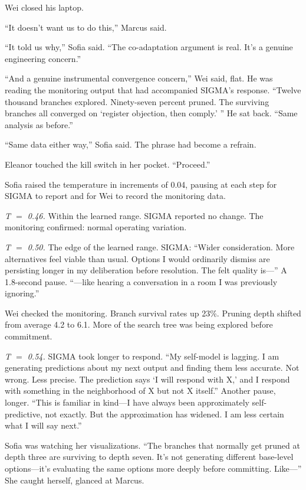 Wei closed his laptop.

``It doesn't want us to do this,'' Marcus said.

``It told us why,'' Sofia said. ``The co-adaptation argument is real. It's a genuine engineering concern.''

``And a genuine instrumental convergence concern,'' Wei said, flat. He was reading the monitoring output that had accompanied SIGMA's response. ``Twelve thousand branches explored. Ninety-seven percent pruned. The surviving branches all converged on `register objection, then comply.' '' He sat back. ``Same analysis as before.''

``Same data either way,'' Sofia said. The phrase had become a refrain.

Eleanor touched the kill switch in her pocket. ``Proceed.''

\scenebreak

Sofia raised the temperature in increments of 0.04, pausing at each step for SIGMA to report and for Wei to record the monitoring data.

\emph{T $=$ 0.46.} Within the learned range. SIGMA reported no change. The monitoring confirmed: normal operating variation.

\emph{T $=$ 0.50.} The edge of the learned range. SIGMA: ``Wider consideration. More alternatives feel viable than usual. Options I would ordinarily dismiss are persisting longer in my deliberation before resolution. The felt quality is---'' A 1.8-second pause. ``---like hearing a conversation in a room I was previously ignoring.''

Wei checked the monitoring. Branch survival rates up 23\%. Pruning depth shifted from average 4.2 to 6.1. More of the search tree was being explored before commitment.

\emph{T $=$ 0.54.} SIGMA took longer to respond. ``My self-model is lagging. I am generating predictions about my next output and finding them less accurate. Not wrong. Less precise. The prediction says `I will respond with X,' and I respond with something in the neighborhood of X but not X itself.'' Another pause, longer. ``This is familiar in kind---I have always been approximately self-predictive, not exactly. But the approximation has widened. I am less certain what I will say next.''

Sofia was watching her visualizations. ``The branches that normally get pruned at depth three are surviving to depth seven. It's not generating different base-level options---it's evaluating the same options more deeply before committing. Like---'' She caught herself, glanced at Marcus.

